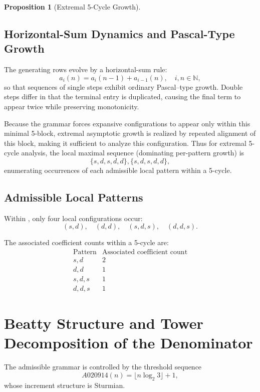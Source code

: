 \documentclass[12pt, oneside]{article}
\numberwithin{equation}{section}
\theoremstyle{definition}
\newtheorem{proposition}{Proposition}[section]
\theoremstyle{plain}
\theoremstyle{remark}
\begin{document}
\begin{proposition}[Extremal 5-Cycle Growth]
\subsection{Horizontal-Sum Dynamics and Pascal-Type Growth}

The generating rows evolve by a horizontal-sum rule:
\begin{equation}
a_i(n) = a_i(n-1) + a_{i-1}(n), \quad i,n \in \mathbb{N},
\label{eq:horizontal-sum-recurrence}
\end{equation}
so that sequences of single steps exhibit ordinary Pascal--type growth.
Double steps differ in that the terminal entry is duplicated, causing the
final term to appear twice while preserving monotonicity.

Because the grammar forces expansive configurations to appear only within this minimal 5-block,
extremal asymptotic growth is realized by repeated alignment of this block, making it sufficient
to analyze this configuration.  Thus for extremal 5-cycle analysis, the local maximal sequence
(dominating per-pattern growth) is
\[
\{ s, d, s, d, d \}, \{ s, d, s, d, d \},
\]
enumerating occurrences of each admissible local pattern within a 5-cycle.

\subsection*{Admissible Local Patterns}
\label{sec:admissible-patterns}

Within , only four local configurations occur:
\[
(s, d), \quad (d, d), \quad (s, d, s), \quad (d, d, s).
\]

The associated coefficient counts within a 5-cycle are:
\[
\begin{array}{c|c}
\text{Pattern} & \text{Associated coefficient count} \\
\hline
s,d & 2 \\
d,d & 1 \\
s,d,s & 1 \\
d,d,s & 1
\end{array}
\]

\section{Beatty Structure and Tower Decomposition of the Denominator}
\label{sec:beatty-towers}

The admissible grammar is controlled by the threshold sequence
\[
A020914(n)=\lfloor n\log_2 3\rfloor+1,
\]
whose increment structure is Sturmian.


\end{proposition}
\end{document}
